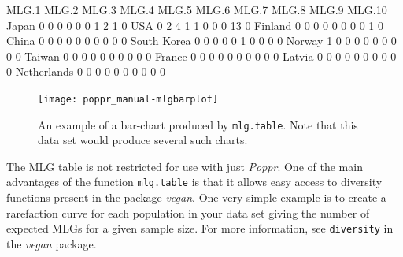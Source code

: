\documentclass[letterpaper]{article}
\begin{document}
\begin{Schunk}
\begin{Soutput}
            MLG.1 MLG.2 MLG.3 MLG.4 MLG.5 MLG.6 MLG.7 MLG.8 MLG.9 MLG.10
Japan           0     0     0     0     0     0     1     2     1      0
USA             0     2     4     1     1     0     0     0    13      0
Finland         0     0     0     0     0     0     0     0     1      0
China           0     0     0     0     0     0     0     0     0      0
South Korea     0     0     0     0     0     1     0     0     0      0
Norway          1     0     0     0     0     0     0     0     0      0
Taiwan          0     0     0     0     0     0     0     0     0      0
France          0     0     0     0     0     0     0     0     0      0
Latvia          0     0     0     0     0     0     0     0     0      0
Netherlands     0     0     0     0     0     0     0     0     0      0
\end{Soutput}
\end{Schunk}
\begin{figure}[h!]
  \centering
  \caption{An example of a bar-chart produced by \texttt{mlg.table}. Note that this data set would produce several such charts.}
  \label{nortable}
\texttt{[image: poppr\_manual-mlgbarplot]}
\end{figure}

The MLG table is not restricted for use with just \textit{Poppr}. One of the main advantages of the function \texttt{mlg.table} is that it allows easy access to diversity functions present in the package \textit{vegan}. \cite{vegan} One very simple example is to create a rarefaction curve for each population in your data set giving the number of expected MLGs for a given sample size. For more information, see \texttt{diversity} in the \textit{vegan} package.
\end{document}

